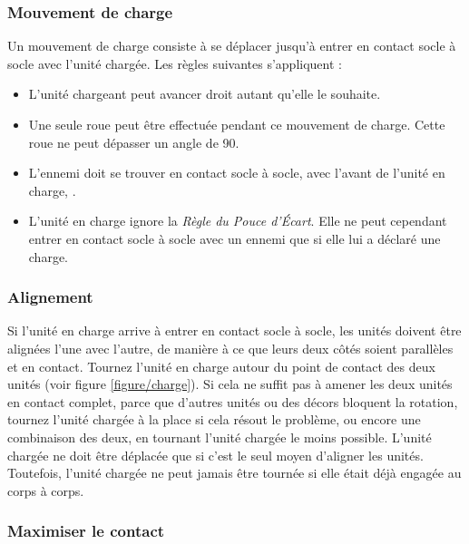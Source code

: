 \subsubsection*{Mouvement de charge}

Un mouvement de charge consiste à se déplacer jusqu'à entrer en contact socle à socle avec l'unité chargée. Les règles suivantes s'appliquent :
\begin{itemize}[label={-}]
\item L'unité chargeant peut avancer droit autant qu'elle le souhaite.
\item Une seule roue peut être effectuée pendant ce mouvement de charge. Cette roue ne peut dépasser un angle de \unit{90}{\text{\degree}}.
\item L'ennemi doit se trouver en contact socle à socle, avec l'avant de l'unité en charge, .
\item L'unité en charge ignore la \emph{Règle du Pouce d'Écart}. Elle ne peut cependant entrer en contact socle à socle avec un ennemi que si elle lui a déclaré une charge.
\end{itemize}

\subsubsection*{Alignement}

Si l'unité en charge arrive à entrer en contact socle à socle, les unités doivent être alignées l'une avec l'autre, de manière à ce que leurs deux côtés soient parallèles et en contact. Tournez l'unité en charge autour du point de contact des deux unités (voir figure \ref{figure/charge}). Si cela ne suffit pas à amener les deux unités en contact complet, parce que d'autres unités ou des décors bloquent la rotation, tournez l'unité chargée à la place si cela résout le problème, ou encore une combinaison des deux, en tournant l'unité chargée le moins possible. L'unité chargée ne doit être déplacée que si c'est le seul moyen d'aligner les unités. Toutefois, l'unité chargée ne peut jamais être tournée si elle était déjà engagée au corps à corps. 

\subsubsection*{Maximiser le contact}

